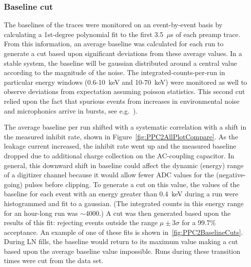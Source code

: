 			\subsubsection{Baseline cut}	
	The baselines of the traces were monitored on an event-by-event basis by calculating a 1st-degree polynomial fit to the first 3.5~$\mu$s of each preamp trace.  From this information, an average baseline was calculated for each run to generate a cut based upon significant deviations from these average values.  In a stable system, the baseline will be gaussian distributed around a central value according to the magnitude of the noise.  The integrated-counts-per-run in particular energy windows (0.6-10~keV and 10-70~keV) were monitored as well to observe deviations from expectation assuming poisson statistics.  This second cut relied upon the fact that spurious events from increases in environmental noise and microphonics arrive in bursts, see e.g.~\cite{Morales1992410}).  
	
	The average baseline per run shifted with a systematic correlation with a shift in the measured inhibit rate, shown in Figure~\ref{fig:PPC2AllPlotCompare}.  As the leakage current increased, the inhibit rate went up and the measured baseline dropped due to additional charge collection on the AC-coupling capacitor.  In general, this downward shift in baseline could affect the dynamic (energy) range of a digitizer channel because it would allow fewer ADC values for the (negative-going) pulses before clipping.  To generate a cut on this value, the values of the baseline for each event with an energy greater than 0.4~keV during a run were histogrammed and fit to a gaussian.  (The integrated counts in this energy range for an hour-long run was $\sim$4000.)  A cut was then generated based upon the results of this fit: rejecting events outside the range $\mu\pm3\sigma$ for a 99.7\% acceptance.  An example of one of these fits is shown in~\ref{fig:PPC2BaselineCuts}.  During LN fills, the baseline would return to its maximum value making a cut based upon the average baseline value impossible.  Runs during these transition times were cut from the data set.  
		
						
